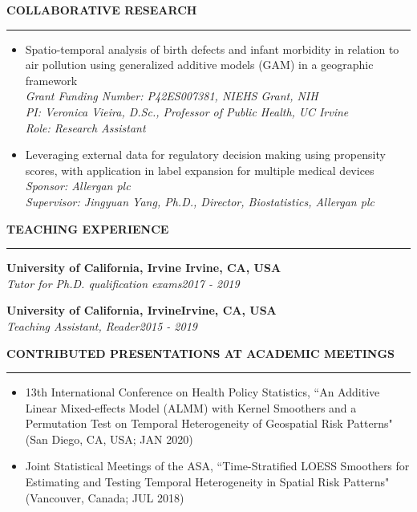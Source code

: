 {	\vspace{12pt}
	\textbf{COLLABORATIVE RESEARCH} \hrule %
	\vspace{-0.15 in}
	\begin{itemize} \setlength{\itemsep}{2pt}  \setlength{\parskip}{0pt}
		\item {Spatio-temporal analysis of birth defects and infant morbidity in relation to air pollution using generalized additive models (GAM) in a geographic framework} \\
		{\em Grant Funding Number: P42ES007381, NIEHS Grant, NIH\\
			PI: Veronica Vieira, D.Sc., Professor of Public Health, UC Irvine \\
			Role: Research Assistant}
		\item Leveraging external data for regulatory decision making using propensity scores, with application in label expansion for multiple medical devices \\
		{\em Sponsor: Allergan plc \\
			Supervisor: Jingyuan Yang, Ph.D., Director, Biostatistics, Allergan plc}
	\end{itemize}

	\pagebreak

	\vspace{12pt}
	\textbf{TEACHING EXPERIENCE} \hrule 
	
	{\bf University of California, Irvine \hfill  Irvine, CA, USA} \\
	{\em Tutor for Ph.D. qualification exams\hfill 2017 - 2019}
	
	{\bf University of California, Irvine\hfill  Irvine, CA, USA}  \\
	{\em Teaching Assistant, Reader}\hfill {\em 2015 - 2019}

	\vspace{12pt}
	\textbf{\uppercase{CONTRIBUTED Presentations at Academic Meetings}} \hrule 
	\vspace{-0.15 in}
	\begin{itemize} \setlength{\itemsep}{2pt}  \setlength{\parskip}{0pt}
		\item 13th International Conference on Health Policy Statistics, ``An Additive Linear Mixed-effects Model (ALMM) with Kernel Smoothers and a Permutation Test on Temporal Heterogeneity of Geospatial Risk Patterns" (San Diego, CA, USA; JAN 2020)
		\item Joint Statistical Meetings of the ASA, ``Time-Stratified LOESS Smoothers for Estimating and Testing Temporal Heterogeneity in Spatial Risk Patterns" (Vancouver, Canada; JUL 2018)
	\end{itemize}

}
